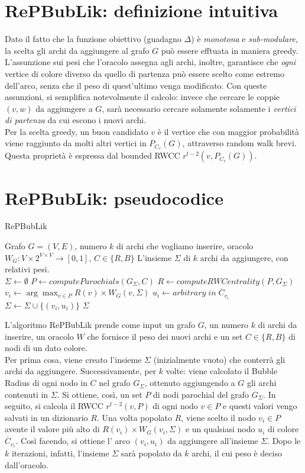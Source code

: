 \section{RePBubLik: definizione intuitiva}
Dato il fatto che la funzione obiettivo (guadagno $\Delta$) è \emph{monotona} e \emph{sub-modulare}, la scelta gli archi da aggiungere al grafo $G$ può essere efftuata in maniera greedy.
L'assunzione sui pesi che l'oracolo assegna agli archi, inoltre, garantisce che \emph{ogni} vertice di colore diverso da quello di partenza può essere scelto come estremo dell'arco, 
senza che il peso di quest'ultimo venga modificato. Con queste assunzioni, si semplifica notevolmente il calcolo: invece che cercare le coppie $(v,w)$ da aggiungere a $G$, sarà necessario cercare solamente 
solamente i \emph{vertici di partenza} da cui escono i nuovi archi. \\
Per la scelta greedy, un buon candidato $v$ è il vertice che con maggior probabilità viene raggiunto da molti altri vertici in $P_{C_v}(G)$, attraverso random walk brevi. 
Questa proprietà è espressa dal bounded RWCC $r^{t-2}(v,P_{C_v}(G))$.
\newpage
\section{RePBubLik: pseudocodice}
\begin{algorithm}[!h]
    \caption{RePBubLik}\label{alg:repbublik}
    \begin{algorithmic}
    \Require Grafo $G=(V,E)$, numero $k$ di archi che vogliamo inserire, oracolo $W_G: V \times 2^{V\times V} \to [0,1]$, $C\in\{R,B\}$
    \Ensure L'insieme $\Sigma$ di $k$ archi da aggiungere, con relativi pesi.
    \\
    \State $\Sigma \gets \emptyset$
        \State $P \gets computeParochials(G_{\Sigma},C)$
        \State $R \gets computeRWCentrality(P,G_{\Sigma})$
        \State $v_i \gets \arg\max_{v \in P} R(v)\times W_G(v,\Sigma)$
        \State $u_i \gets arbitrary \; in \; \overline{C}_{v_i}$
        \State $\Sigma \gets \Sigma \cup \{(v_i,u_i)\}$
    \EndFor
    \State\Return $\Sigma$
    \end{algorithmic}
\end{algorithm}
L'algoritmo RePBubLik prende come input un grafo $G$, un numero $k$ di archi da inserire, 
un oracolo $W$ che fornisce il peso dei nuovi archi e un set $C\in\{R,B\}$ di nodi di un dato colore.\\
Per prima cosa, viene creato l'insieme $\Sigma$ (inizialmente vuoto) che conterrà gli archi da aggiungere.
Successivamente, per $k$ volte: viene calcolato il Bubble Radius di ogni nodo in $C$ nel grafo $G_\Sigma$, ottenuto 
aggiungendo a $G$ gli archi contenuti in $\Sigma$. Si ottiene, così, un set $P$ di nodi parochial del grafo $G_\Sigma$.
In seguito, si calcola il RWCC $r^{t-2}(v,P)$ di ogni nodo $v\in P$ e questi valori vengo salvati in un dizionario $R$.
Una volta popolato $R$, viene scelto il nodo $v_i\in P$ avente il valore più alto di $R(v_i)\times W_G(v_i,\Sigma)$ e un 
qualsiasi nodo $u_i$ di colore $\overline{C}_{v_i}$. Così facendo, si ottiene l' arco $(v_i,u_i)$ da aggiungere all'insieme $\Sigma$.
Dopo le $k$ iterazioni, infatti, l'insieme $\Sigma$ sarà popolato da $k$ archi, il cui peso è deciso dall'oracolo.
